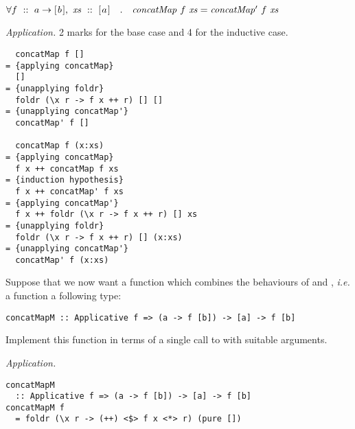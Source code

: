 \begin{parts}
\begin{subparts}
    \vspace*{0.2cm}

    $\forall f~::~a \to [\mskip1.5mu b \mskip1.5mu],~\mathit{xs}~::~[\mskip1.5mu a \mskip1.5mu] \quad . \quad \mathit{concatMap}~f~\mathit{xs} = \mathit{concatMap'}~f~\mathit{xs}$ \droppoints
    \begin{solution} \emph{Application.} 2 marks for the base case and 4 for the inductive case.
\begin{verbatim}
  concatMap f []
= {applying concatMap}
  []
= {unapplying foldr}
  foldr (\x r -> f x ++ r) [] []
= {unapplying concatMap'} 
  concatMap' f []

  concatMap f (x:xs)
= {applying concatMap}
  f x ++ concatMap f xs 
= {induction hypothesis}
  f x ++ concatMap' f xs 
= {applying concatMap'}
  f x ++ foldr (\x r -> f x ++ r) [] xs 
= {unapplying foldr}
  foldr (\x r -> f x ++ r) [] (x:xs)
= {unapplying concatMap'}
  concatMap' f (x:xs)
\end{verbatim} 
    \end{solution}
    \vspace*{0.2cm}
    \subpart[5] Suppose that we now want a function which combines the behaviours of  and , \emph{i.e.} a function a following type:
    
    \vspace*{0.2cm}

\begin{verbatim}
concatMapM :: Applicative f => (a -> f [b]) -> [a] -> f [b]
\end{verbatim}

    \vspace*{0.2cm}

    Implement this function in terms of a single call to  with suitable arguments. \droppoints
    \begin{solution} \emph{Application.}
\begin{verbatim}
concatMapM 
  :: Applicative f => (a -> f [b]) -> [a] -> f [b]
concatMapM f 
  = foldr (\x r -> (++) <$> f x <*> r) (pure [])
\end{verbatim}
    \end{solution}
\end{subparts}
\end{parts}